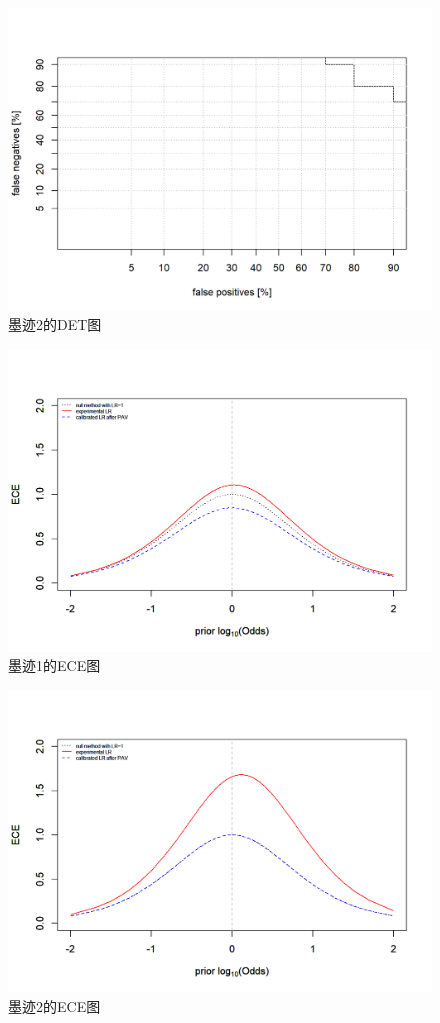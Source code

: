 \documentclass[12pt,a4paper]{article}
\begin{document}
    \begin{figure}[H]
        \centering
        \includegraphics[scale=0.8]{InkDET2.png}
        \caption*{墨迹2的DET图}
    \end{figure}
    \begin{figure}[H]
        \centering
        \includegraphics[scale=0.8]{InkECE1.png}
        \caption*{墨迹1的ECE图}
    \end{figure}
    \begin{figure}[H]
        \centering
        \includegraphics[scale=0.8]{InkECE2.png}
        \caption*{墨迹2的ECE图}
    \end{figure}
\end{document}

